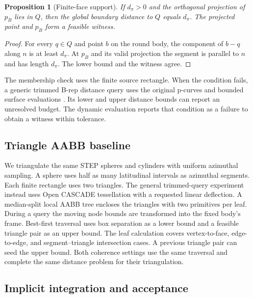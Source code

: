 \documentclass[10pt,a4paper]{article}
\newtheorem{proposition}{Proposition}
\begin{document}
\begin{proposition}[Finite-face support]
If \(d_\pi>0\) and the orthogonal projection of \(p_B\) lies in \(Q\), then the global boundary distance to \(Q\) equals \(d_\pi\). The projected point and \(p_B\) form a feasible witness.
\end{proposition}
\begin{proof}
For every \(q\in Q\) and point \(b\) on the round body, the component of \(b-q\) along \(n\) is at least \(d_\pi\). At \(p_B\) and its valid projection the segment is parallel to \(n\) and has length \(d_\pi\). The lower bound and the witness agree.
\end{proof}

The membership check uses the finite source rectangle. When the condition fails, a generic trimmed B-rep distance query uses the original p-curves and bounded surface evaluations \cite{chen2024,crozet2018}. Its lower and upper distance bounds can report an unresolved budget. The dynamic evaluation reports that condition as a failure to obtain a witness within tolerance.

\subsection{Triangle AABB baseline}

We triangulate the same STEP spheres and cylinders with uniform azimuthal sampling. A sphere uses half as many latitudinal intervals as azimuthal segments. Each finite rectangle uses two triangles. The general trimmed-query experiment instead uses Open CASCADE tessellation with a requested linear deflection. A median-split local AABB tree encloses the triangles with two primitives per leaf. During a query the moving node bounds are transformed into the fixed body's frame. Best-first traversal uses box separation as a lower bound and a feasible triangle pair as an upper bound. The leaf calculation covers vertex-to-face, edge-to-edge, and segment--triangle intersection cases. A previous triangle pair can seed the upper bound. Both coherence settings use the same traversal and complete the same distance problem for their triangulation.

\subsection{Implicit integration and acceptance}
\end{document}

